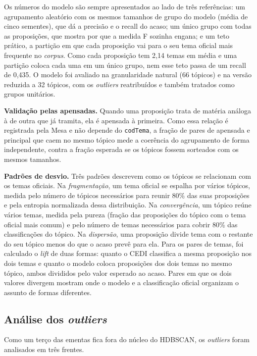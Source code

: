 Os números do modelo são sempre apresentados ao lado de três referências: um agrupamento aleatório com os mesmos tamanhos de grupo do modelo (média de cinco sementes), que dá a precisão e o recall do acaso; um único grupo com todas as proposições, que mostra por que a medida F sozinha engana; e um teto prático, a partição em que cada proposição vai para o seu tema oficial mais frequente no \textit{corpus}. Como cada proposição tem 2,14 temas em média e uma partição coloca cada uma em um único grupo, nem esse teto passa de um recall de 0,435. O modelo foi avaliado na granularidade natural (66 tópicos) e na versão reduzida a 32 tópicos, com os \textit{outliers} reatribuídos e também tratados como grupos unitários.

\textbf{Validação pelas apensadas.} Quando uma proposição trata de matéria análoga à de outra que já tramita, ela é apensada à primeira. Como essa relação é registrada pela Mesa e não depende do \texttt{codTema}, a fração de pares de apensada e principal que caem no mesmo tópico mede a coerência do agrupamento de forma independente, contra a fração esperada se os tópicos fossem sorteados com os mesmos tamanhos.

\textbf{Padrões de desvio.} Três padrões descrevem como os tópicos se relacionam com os temas oficiais. Na \textit{fragmentação}, um tema oficial se espalha por vários tópicos, medida pelo número de tópicos necessários para reunir 80\% das suas proposições e pela entropia normalizada dessa distribuição. Na \textit{convergência}, um tópico reúne vários temas, medida pela pureza (fração das proposições do tópico com o tema oficial mais comum) e pelo número de temas necessários para cobrir 80\% das classificações do tópico. Na \textit{dispersão}, uma proposição divide tema com o restante do seu tópico menos do que o acaso prevê para ela. Para os pares de temas, foi calculado o \textit{lift} de duas formas: quanto o CEDI classifica a mesma proposição nos dois temas e quanto o modelo coloca proposições dos dois temas no mesmo tópico, ambos divididos pelo valor esperado ao acaso. Pares em que os dois valores divergem mostram onde o modelo e a classificação oficial organizam o assunto de formas diferentes.

\subsection{Análise dos \textit{outliers}}
\label{subsec:outliers}

Como um terço das ementas fica fora do núcleo do HDBSCAN, os \textit{outliers} foram analisados em três frentes.

